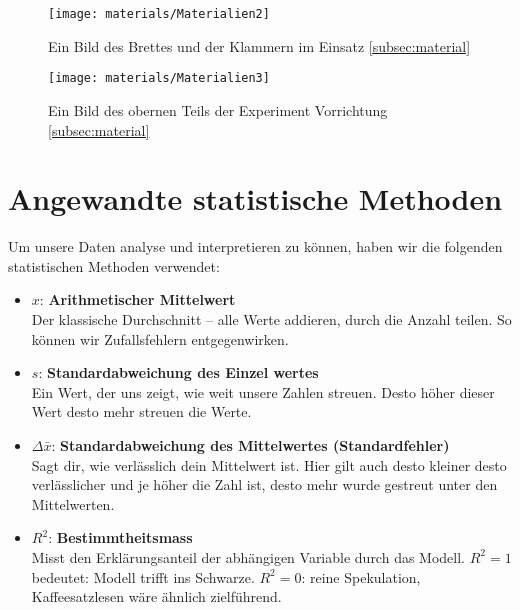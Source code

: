 \documentclass[../main.tex]{subfiles} %
\begin{document}
            \begin{figure}[H]
                \centering
                \texttt{[image: materials/Materialien2]}
                \caption{Ein Bild des Brettes und der Klammern im Einsatz \ref{subsec:material}}
                \label{fig:material2}
            \end{figure}

            \begin{figure}[H]
                \centering
                \texttt{[image: materials/Materialien3]}
                \caption{Ein Bild des obernen Teils der Experiment Vorrichtung  \ref{subsec:material}}
                \label{fig:material3}
            \end{figure}

    \section{Angewandte statistische Methoden}\label{sec:angewandte-statistische-methoden}
        Um unsere Daten analyse und interpretieren zu können, haben wir die folgenden statistischen Methoden verwendet:
        \begin{itemize}
            \item $x$: \textbf{Arithmetischer Mittelwert} \\
            \quad Der klassische Durchschnitt – alle Werte addieren, durch die Anzahl teilen.
                  So können wir Zufallsfehlern entgegenwirken.

            \item $s$: \textbf{Standardabweichung des Einzel    wertes} \\
            \quad Ein Wert, der uns zeigt, wie weit unsere Zahlen streuen.
                  Desto höher dieser Wert desto mehr streuen die Werte.

            \item $\Delta \bar{x}$: \textbf{Standardabweichung des Mittelwertes (Standardfehler)} \\
            \quad Sagt dir, wie verlässlich dein Mittelwert ist.
                  Hier gilt auch desto kleiner desto verlässlicher und je höher die Zahl ist, desto mehr wurde gestreut unter den Mittelwerten.

            \item $R^2$: \textbf{Bestimmtheitsmass} \\
            \quad Misst den Erklärungsanteil der abhängigen Variable durch das Modell. $R^2 = 1$ bedeutet: Modell trifft ins Schwarze. $R^2 = 0$: reine Spekulation, Kaffeesatzlesen wäre ähnlich zielführend.
        \end{itemize}
\end{document}
